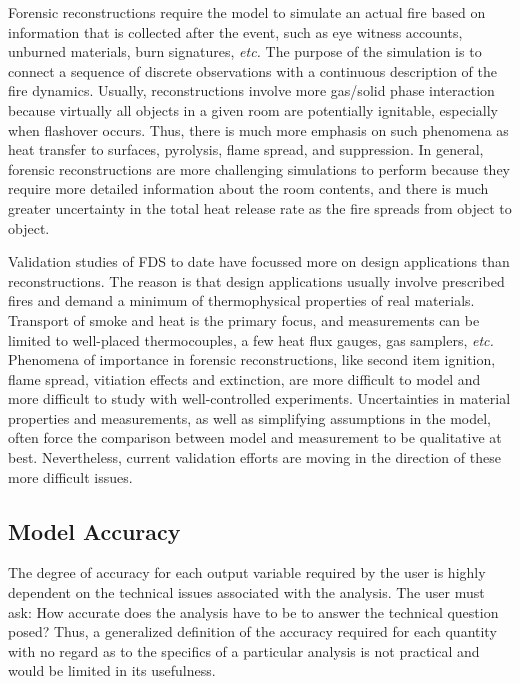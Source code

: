 Forensic reconstructions require the  model to simulate an actual fire
based on  information that is collected  after the event,  such as eye
witness accounts, unburned materials,  burn signatures, {\em etc.} The
purpose  of  the simulation  is  to  connect  a sequence  of  discrete
observations  with  a continuous  description  of  the fire  dynamics.
Usually,  reconstructions  involve  more gas/solid  phase  interaction
because  virtually  all  objects  in  a  given  room  are  potentially
ignitable, especially when flashover  occurs. Thus, there is much more
emphasis on  such phenomena as  heat transfer to  surfaces, pyrolysis,
flame  spread, and suppression.  In general,  forensic reconstructions
are more challenging simulations  to perform because they require more
detailed  information  about the  room  contents,  and  there is  much
greater uncertainty in the total heat release rate as the fire spreads
from object to object.

Validation  studies  of FDS  to  date  have  focussed more  on  design
applications   than  reconstructions.  The   reason  is   that  design
applications usually involve prescribed  fires and demand a minimum of
thermophysical properties  of real materials.  Transport  of smoke and
heat  is  the  primary  focus,  and measurements  can  be  limited  to
well-placed thermocouples, a few  heat flux gauges, gas samplers, {\em
etc.} Phenomena of importance in forensic reconstructions, like second
item  ignition, flame  spread, vitiation  effects and  extinction, are
more   difficult  to   model  and   more  difficult   to   study  with
well-controlled experiments. Uncertainties  in material properties and
measurements, as  well as simplifying assumptions in  the model, often
force the  comparison between model and measurement  to be qualitative
at best.  Nevertheless, current validation  efforts are moving  in the
direction of these more difficult issues.




\subsection{Model Accuracy}

The degree of  accuracy for each output variable  required by the user
is  highly  dependent on  the  technical  issues  associated with  the
analysis.  The user  must ask: How accurate does  the analysis have to
be  to  answer  the  technical  question posed?  Thus,  a  generalized
definition of the  accuracy required for each quantity  with no regard
as  to the specifics  of a  particular analysis  is not  practical and
would be limited in its usefulness.

